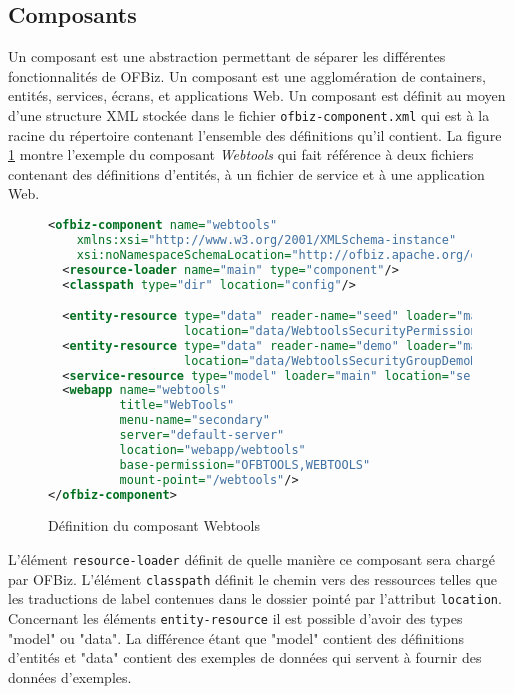 \documentclass[a4paper, 11pt]{report}
\begin{document}
\subsection{Composants}

Un composant est une abstraction permettant de séparer les différentes
fonctionnalités de OFBiz. Un composant est une agglomération de
containers, entités, services, écrans, et applications Web. Un
composant est définit au moyen d'une structure XML stockée dans le
fichier \verb=ofbiz-component.xml= qui est à la racine du répertoire
contenant l'ensemble des définitions qu'il contient. La figure
\ref{fig:ofbizcomponent} montre l'exemple du composant \emph{Webtools}
qui fait référence à deux fichiers contenant des définitions
d'entités, à un fichier de service et à une application Web.

\begin{figure}
  \begin{lstlisting}[language=xml]
<ofbiz-component name="webtools"
    xmlns:xsi="http://www.w3.org/2001/XMLSchema-instance"
    xsi:noNamespaceSchemaLocation="http://ofbiz.apache.org/dtds/ofbiz-component.xsd">
  <resource-loader name="main" type="component"/>
  <classpath type="dir" location="config"/>

  <entity-resource type="data" reader-name="seed" loader="main"
                   location="data/WebtoolsSecurityPermissionSeedData.xml"/>
  <entity-resource type="data" reader-name="demo" loader="main"
                   location="data/WebtoolsSecurityGroupDemoData.xml"/>
  <service-resource type="model" loader="main" location="servicedef/services.xml"/>
  <webapp name="webtools"
          title="WebTools"
          menu-name="secondary"
          server="default-server"
          location="webapp/webtools"
          base-permission="OFBTOOLS,WEBTOOLS"
          mount-point="/webtools"/>
</ofbiz-component>
  \end{lstlisting}
  \caption{Définition du composant Webtools}
  \label{fig:ofbizcomponent}
\end{figure}

L'élément \verb=resource-loader= définit de quelle manière ce
composant sera chargé par OFBiz. L'élément \verb=classpath= définit le
chemin vers des ressources telles que les traductions de label contenues
dans le dossier pointé par l'attribut \verb=location=. Concernant les
éléments \verb=entity-resource= il est possible d'avoir des types
"model" ou "data". La différence étant que "model" contient des
définitions d'entités et "data" contient des exemples de données qui
servent à fournir des données d'exemples.
\end{document}
